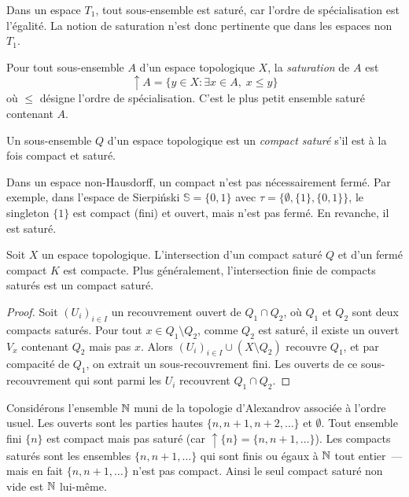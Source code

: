 \begin{remarque}
Dans un espace $T_1$, tout sous-ensemble est satur\'e, car l'ordre de sp\'ecialisation est
l'\'egalit\'e. La notion de saturation n'est donc pertinente que dans les espaces non $T_1$.
\end{remarque}

\begin{proposition}
Pour tout sous-ensemble $A$ d'un espace topologique $X$, la \emph{saturation} de $A$ est
\[
  \uparrow\! A = \{ y \in X : \exists x \in A, \; x \leq y \}
\]
o\`u $\leq$ d\'esigne l'ordre de sp\'ecialisation. C'est le plus petit ensemble satur\'e
contenant $A$.
\end{proposition}

\begin{definition}
Un sous-ensemble $Q$ d'un espace topologique est un \emph{compact satur\'e} s'il est
\`a la fois compact et satur\'e.
\end{definition}

\begin{attention}
Dans un espace non-Hausdorff, un compact n'est pas n\'ecessairement ferm\'e. Par exemple,
dans l'espace de Sierpi\'nski $\mathbb{S} = \{0,1\}$ avec $\tau = \{\emptyset, \{1\}, \{0,1\}\}$,
le singleton $\{1\}$ est compact (fini) et ouvert, mais n'est pas ferm\'e. En revanche,
il est satur\'e.
\end{attention}

\begin{theoreme}
\label{thm:inter-compact-sature}
Soit $X$ un espace topologique. L'intersection d'un compact satur\'e $Q$ et d'un ferm\'e
compact $K$ est compacte. Plus g\'en\'eralement, l'intersection finie de compacts satur\'es
est un compact satur\'e.
\end{theoreme}

\begin{proof}
Soit $(U_i)_{i \in I}$ un recouvrement ouvert de $Q_1 \cap Q_2$, o\`u $Q_1$ et $Q_2$
sont deux compacts satur\'es. Pour tout $x \in Q_1 \setminus Q_2$, comme $Q_2$ est satur\'e,
il existe un ouvert $V_x$ contenant $Q_2$ mais pas $x$. Alors
$(U_i)_{i \in I} \cup (X \setminus Q_2)$ recouvre $Q_1$, et par compacit\'e de $Q_1$, on
extrait un sous-recouvrement fini. Les ouverts de ce sous-recouvrement qui sont parmi les
$U_i$ recouvrent $Q_1 \cap Q_2$.
\end{proof}

\begin{exemple}
Consid\'erons l'ensemble $\mathbb{N}$ muni de la topologie d'Alexandrov associ\'ee \`a l'ordre
usuel. Les ouverts sont les parties hautes $\{n, n+1, n+2, \ldots\}$ et $\emptyset$.
Tout ensemble fini $\{n\}$ est compact mais pas satur\'e (car $\uparrow\! \{n\} = \{n, n+1, \ldots\}$).
Les compacts satur\'es sont les ensembles $\{n, n+1, \ldots\}$ qui sont finis ou \'egaux
\`a $\mathbb{N}$ tout entier~--- mais en fait $\{n, n+1, \ldots\}$ n'est pas compact. Ainsi le seul
compact satur\'e non vide est $\mathbb{N}$ lui-m\^eme.
\end{exemple}


